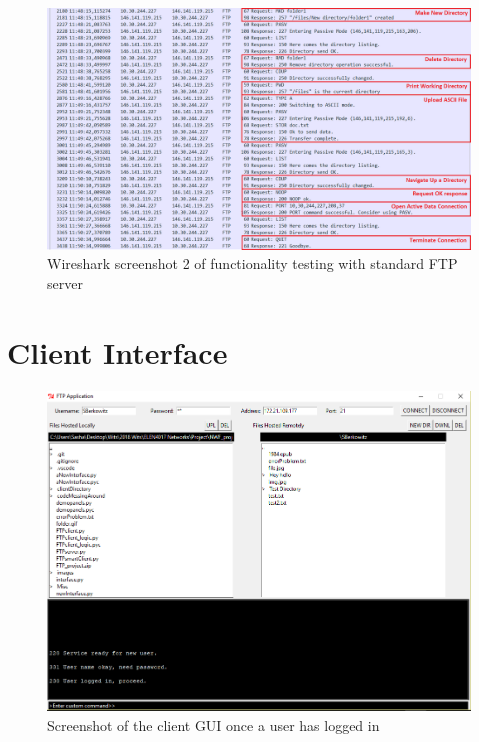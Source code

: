 \documentclass[10pt,twocolumn]{witseiepaper}
\begin{document}
\begin{appendix}
\begin{figure}[h]
\centering
\includegraphics[width=0.9\columnwidth]{WitsServerCapture2.png}
\caption{Wireshark screenshot 2 of functionality testing with standard FTP server}
\raggedright
\label{fig:WitsWS2}
\end{figure}

\newpage

\section{Client Interface}\label{sec:GUIAppendix}
\begin{figure}[h]
\centering
\includegraphics[width=0.8\columnwidth]{interface.png}
\caption{Screenshot of the client GUI once a user has logged in}
\raggedright
\label{fig:ClientGUI}
\end{figure}


\end{appendix}
\end{document}
